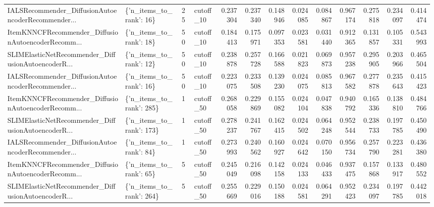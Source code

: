 \begin{tabular}{llllrrrrrrrrr}
IALSRecommender\_DiffusionAutoencoderRecommender... &  \{'n\_items\_to\_rank': 16\} &       25 & cutoff\_10 & 0.237304 &   0.237340 & 0.148946 & 0.024085 &        0.084867 &                   0.967174 &       0.275818 &           0.234097 &            0.414474 \\
ItemKNNCFRecommender\_DiffusionAutoencoderRecomm... &  \{'n\_items\_to\_rank': 18\} &       50 & cutoff\_10 & 0.184413 &   0.175971 & 0.097353 & 0.023581 &        0.031440 &                   0.912365 &       0.131857 &           0.105331 &            0.543993 \\
SLIMElasticNetRecommender\_DiffusionAutoencoderR... &  \{'n\_items\_to\_rank': 12\} &       50 & cutoff\_10 & 0.238878 &   0.257728 & 0.166588 & 0.021823 &        0.069873 &                   0.957238 &       0.295905 &           0.203966 &            0.465504 \\
IALSRecommender\_DiffusionAutoencoderRecommender... &  \{'n\_items\_to\_rank': 16\} &       50 & cutoff\_10 & 0.223075 &   0.233508 & 0.139230 & 0.024075 &        0.085813 &                   0.967582 &       0.277878 &           0.235643 &            0.415423 \\
ItemKNNCFRecommender\_DiffusionAutoencoderRecomm... & \{'n\_items\_to\_rank': 285\} &        1 & cutoff\_50 & 0.268058 &   0.229869 & 0.155082 & 0.024104 &        0.047838 &                   0.940792 &       0.165336 &           0.138810 &            0.484766 \\
SLIMElasticNetRecommender\_DiffusionAutoencoderR... & \{'n\_items\_to\_rank': 173\} &        1 & cutoff\_50 & 0.278237 &   0.241767 & 0.162415 & 0.024502 &        0.064248 &                   0.952544 &       0.238733 &           0.197785 &            0.450490 \\
IALSRecommender\_DiffusionAutoencoderRecommender... &  \{'n\_items\_to\_rank': 84\} &        1 & cutoff\_50 & 0.273993 &   0.240562 & 0.160927 & 0.024642 &        0.070150 &                   0.956734 &       0.257790 &           0.223281 &            0.436380 \\
ItemKNNCFRecommender\_DiffusionAutoencoderRecomm... &  \{'n\_items\_to\_rank': 65\} &        5 & cutoff\_50 & 0.245049 &   0.216098 & 0.142158 & 0.024133 &        0.046433 &                   0.937475 &       0.157868 &           0.133917 &            0.480552 \\
SLIMElasticNetRecommender\_DiffusionAutoencoderR... & \{'n\_items\_to\_rank': 264\} &        5 & cutoff\_50 & 0.255669 &   0.229016 & 0.150188 & 0.024581 &        0.064291 &                   0.952423 &       0.234097 &           0.197785 &            0.442018 \\

\end{tabular}
